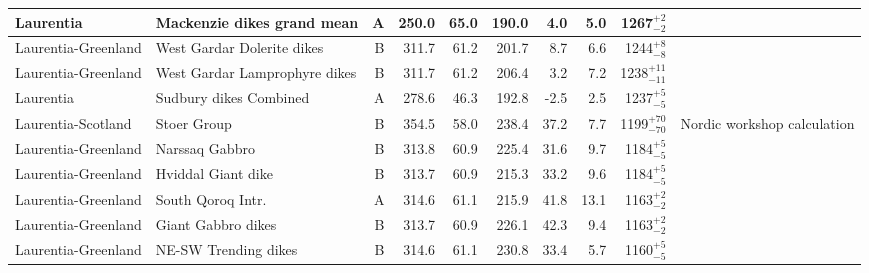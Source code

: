 \begin{longtable}{p{1 in}p{1 in}rrrrrrrp{1.5 in}}
                     Laurentia &                       Mackenzie dikes grand mean &      A &     250.0 &      65.0 & 190.0 &   4.0 &       5.0 &     1267$^{+2}_{-2}$ &                                 \cite{Buchan2000a} \\ \hline
           Laurentia-Greenland &                       West Gardar Dolerite dikes &      B &     311.7 &      61.2 & 201.7 &   8.7 &       6.6 &     1244$^{+8}_{-8}$ &                                  \cite{Piper1977b} \\ \hline
           Laurentia-Greenland &                    West Gardar Lamprophyre dikes &      B &     311.7 &      61.2 & 206.4 &   3.2 &       7.2 &   1238$^{+11}_{-11}$ &                                  \cite{Piper1977b} \\ \hline
                     Laurentia &                           Sudbury dikes Combined &      A &     278.6 &      46.3 & 192.8 &  -2.5 &       2.5 &     1237$^{+5}_{-5}$ &                                 \cite{Palmer1977a} \\ \hline
            Laurentia-Scotland &                                      Stoer Group &      B &     354.5 &      58.0 & 238.4 &  37.2 &       7.7 &   1199$^{+70}_{-70}$ &                        Nordic workshop calculation \\ \hline
           Laurentia-Greenland &                                   Narssaq Gabbro &      B &     313.8 &      60.9 & 225.4 &  31.6 &       9.7 &     1184$^{+5}_{-5}$ &                                  \cite{Piper1977a} \\ \hline
           Laurentia-Greenland &                               Hviddal Giant dike &      B &     313.7 &      60.9 & 215.3 &  33.2 &       9.6 &     1184$^{+5}_{-5}$ &                                  \cite{Piper1977a} \\ \hline
           Laurentia-Greenland &                                South Qoroq Intr. &      A &     314.6 &      61.1 & 215.9 &  41.8 &      13.1 &     1163$^{+2}_{-2}$ &                                  \cite{Piper1992a} \\ \hline
           Laurentia-Greenland &                               Giant Gabbro dikes &      B &     313.7 &      60.9 & 226.1 &  42.3 &       9.4 &     1163$^{+2}_{-2}$ &                                  \cite{Piper1977a} \\ \hline
           Laurentia-Greenland &                             NE-SW Trending dikes &      B &     314.6 &      61.1 & 230.8 &  33.4 &       5.7 &     1160$^{+5}_{-5}$ &                                  \cite{Piper1992a} \\ \hline

\end{longtable}
